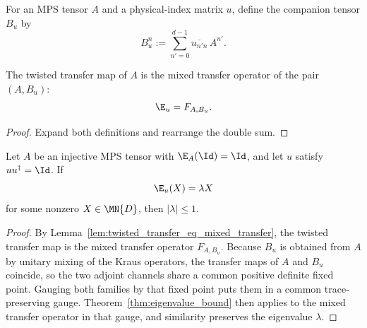 \begin{definition}\label{def:twisted_mixed_companion}
    \leanok
    For an MPS tensor $A$ and a physical-index matrix $u$, define the
    companion tensor $B_u$ by
    \[
        B_u^n := \sum_{n'=0}^{d-1} \overline{u_{n'n}}\, A^{n'}.
    \]
\end{definition}

\begin{lemma}%
    \label{lem:twisted_transfer_eq_mixed_transfer}
    \leanok
    The twisted transfer map of $A$ is the mixed transfer operator of the pair
    $(A,B_u)$:
    \[
        \E_u = F_{A,B_u}.
    \]
\end{lemma}

\begin{proof}
    \leanok
    Expand both definitions and rearrange the double sum.
\end{proof}

\begin{theorem}%
    \label{thm:twisted_transfer_spectral_radius_le_one}
    \leanok
    Let $A$ be an injective MPS tensor with $\E_A(\Id)=\Id$, and let $u$
    satisfy $u u^\dagger = \Id$.
    If
    \[
        \E_u(X) = \lambda X
    \]
    for some nonzero $X \in \MN{D}$, then $|\lambda| \le 1$.
\end{theorem}

\begin{proof}
    \leanok
    By Lemma~\ref{lem:twisted_transfer_eq_mixed_transfer}, the twisted transfer
    map is the mixed transfer operator $F_{A,B_u}$.
    Because $B_u$ is obtained from $A$ by unitary mixing of the Kraus operators,
    the transfer maps of $A$ and $B_u$ coincide, so the two adjoint channels
    share a common positive definite fixed point.
    Gauging both families by that fixed point puts them in a common
    trace-preserving gauge.
    Theorem~\ref{thm:eigenvalue_bound} then applies to the mixed transfer
    operator in that gauge, and similarity preserves the eigenvalue $\lambda$.
\end{proof}


